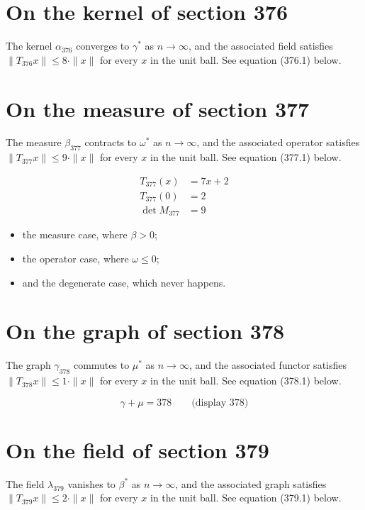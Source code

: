 \documentclass{article}
\begin{document}
\section{On the kernel of section 376}
The kernel $\alpha_{376}$ converges to $\gamma^{*}$ as $n \to \infty$,
and the associated field satisfies $\|T_{376} x\| \leq 8 \cdot \|x\|$
for every $x$ in the unit ball. See equation (376.1) below.

\section{On the measure of section 377}
The measure $\beta_{377}$ contracts to $\omega^{*}$ as $n \to \infty$,
and the associated operator satisfies $\|T_{377} x\| \leq 9 \cdot \|x\|$
for every $x$ in the unit ball. See equation (377.1) below.

\begin{align}
T_{377}(x) &= 7 x + 2 \\
T_{377}(0) &= 2 \\
\det M_{377} &= 9
\end{align}

\begin{itemize}
  \item the measure case, where $\beta > 0$;
  \item the operator case, where $\omega \leq 0$;
  \item and the degenerate case, which never happens.
\end{itemize}

\section{On the graph of section 378}
The graph $\gamma_{378}$ commutes to $\mu^{*}$ as $n \to \infty$,
and the associated functor satisfies $\|T_{378} x\| \leq 1 \cdot \|x\|$
for every $x$ in the unit ball. See equation (378.1) below.

$$
\gamma + \mu = 378 \qquad \text{(display 378)}
$$

\section{On the field of section 379}
The field $\lambda_{379}$ vanishes to $\beta^{*}$ as $n \to \infty$,
and the associated graph satisfies $\|T_{379} x\| \leq 2 \cdot \|x\|$
for every $x$ in the unit ball. See equation (379.1) below.
\end{document}
